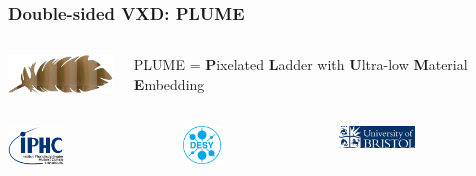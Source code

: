 \documentclass{beamer}
\begin{document}
\begin{frame}
  \frametitle{Double-sided VXD: PLUME}

  \begin{columns}[c]
    \begin{column}{3cm}
      \includegraphics[width = 3cm]{Pictures/logo_plume.png}
    \end{column}
    \vspace{-0.2cm}
    \begin{column}{7cm}
      PLUME = \textbf{P}ixelated \textbf{L}adder with \textbf{U}ltra-low \textbf{M}aterial \textbf{E}mbedding
    \end{column}
  \end{columns}

  \begin{columns}[t]
    \begin{column}{1cm}
      \includegraphics[width = 1.5cm]{Pictures/logo_IPHC_10cm.png}
    \end{column}
    \begin{column}{1cm}
      \includegraphics[width = 1cm]{Pictures/DESY-Logo.png}
    \end{column}
    \begin{column}{1cm}
      \includegraphics[width = 2cm]{Pictures/logo_uni_bristol.jpg}
    \end{column}
  \end{columns}

  \vspace{-0.15cm}


\end{frame}
\end{document}
